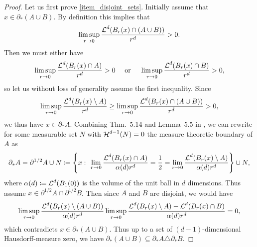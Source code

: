 \begin{proof}
	Let us first prove \cref{item_disjoint_sets}. Initially assume that $ x \in \partial_{ \ast } ( A \cup B ) $. By definition this implies that
	\begin{equation*}
		\limsup_{ r \to 0 }
		\frac{ \operatorname{\mathcal{L}}^{ d } ( B_{ r } ( x ) \cap ( A \cup B ) ) }{ r^{ d } }
		>0.
	\end{equation*}
	Then we must either have
	\begin{equation*}
		\limsup_{ r \to 0 }
		\frac{ \operatorname{\mathcal{L}}^{ d } ( B_{ r } ( x ) \cap A ) }{ r^{ d } }
		>0
		\quad 
		\text{ or }
		\quad
		\limsup_{ r \to 0 }
		\frac{ \operatorname{\mathcal{L}}^{ d } ( B_{ r } ( x ) \cap  B ) }{ r^{ d } }
		>0,
	\end{equation*}
	so let us without loss of generality assume the first inequality. Since
	\begin{equation*}
		\limsup_{ r \to 0 }
		\frac{ \operatorname{\mathcal{L}}^{ d } ( B_{ r } ( x ) \setminus A ) }{ r^{ d } }
		\geq
		\limsup_{ r \to 0 }
		\frac{ \operatorname{\mathcal{L}}^{ d } ( B_{ r } ( x ) \cap ( A \cup B ) ) }{ r^{ d } }
		>0,
	\end{equation*}
	we thus have $ x \in \partial_{ \ast } A $.
	Combining Thm.~5.14 and Lemma~5.5 in \cite{evans_gariepy_measure_theory_and_fine_props}, we can rewrite for some measurable set $ N $ with $ \operatorname{\mathcal{H}}^{ d- 1 } ( N ) = 0 $ the measure theoretic boundary of $ A $ as
	\begin{equation}
		\label{measure_theoretic_boundary_almost_half_boundary}
		\partial_{ \ast } A 
		=
		\partial^{ 1/2 } A \cup N 
		\coloneqq
		\left\{
		x 
		\, \colon \,
		\lim_{ r \to 0 }
		\frac{ \operatorname{\mathcal{L}}^{ d } ( B_{ r } ( x ) \cap A ) }{ \alpha( d ) r^{ d } }
		=
		\frac{ 1 }{ 2 }
		=
		\lim_{ r \to 0 }
		\frac{ \operatorname{\mathcal{L}}^{ d } ( B_{ r } ( x ) \setminus A ) }{ \alpha( d ) r^{ d } }
		\right\}
		\cup N,
	\end{equation}
	where $ \alpha ( d ) \coloneqq \operatorname{\mathcal{L}}^{ d } ( B_{ 1 } ( 0 ) ) $ is the volume of the unit ball in $ d $ dimensions.
	Thus assume $ x \in \partial^{ 1/2 } A \cap \partial^{ 1/2 } B $. Then since $ A $ and $ B $ are disjoint, we would have
	\begin{equation*}
		\limsup_{ r \to 0 }
		\frac{ \operatorname{\mathcal{L}}^{ d } ( B_{ r } ( x ) \setminus  ( A \cup B ) ) }{ \alpha( d ) r^{ d } }
		\limsup_{ r \to 0 }
		\frac{ \operatorname{\mathcal{L}}^{ d } ( B_{ r } ( x ) \setminus A ) - \operatorname{\mathcal{L}}^{ d } ( B_{ r } ( x ) \cap B ) }{ \alpha( d ) r^{ d } }
		=
		0,
	\end{equation*}
	which contradicts $ x \in \partial_{ \ast } ( A \cup B ) $. Thus up to a set of $(d-1)$-dimensional Hausdorff-measure zero, we have 
	$ \partial_{ \ast } ( A \cup B ) \subseteq \partial_{ \ast } A \triangle \partial_{ \ast } B $.
	

\end{proof}

